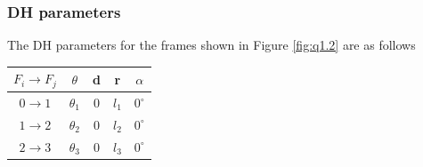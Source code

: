 \documentclass[12pt]{article}
\begin{document}
\subsubsection*{DH parameters}
The DH parameters for the frames shown in Figure \ref{fig:q1.2} are as follows
\begin{center}
\begin{tabular}{ c | c c c c }
 \hline
 $F_i \to F_j$ & $\theta$ & d & r & $\alpha$ \\
 \hline
 $0 \to 1$ & $\theta_1$ & 0 & $l_1$ & $0^{\circ}$ \\
 $1 \to 2$ & $\theta_2$ & 0 & $l_2$ & $0^{\circ}$ \\
 $2 \to 3$ & $\theta_3$ & 0 & $l_3$ & $0^{\circ}$ \\
 \hline
\end{tabular}
\end{center}
\end{document}
